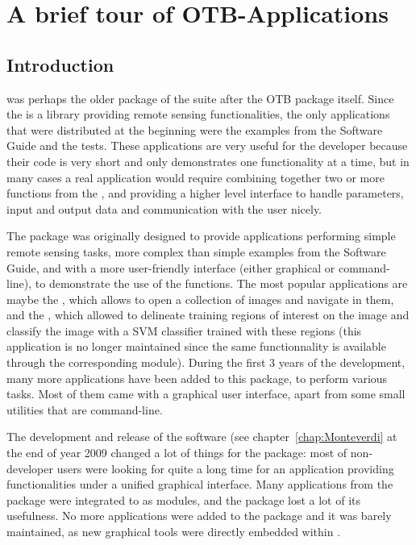 \chapter{A brief tour of OTB-Applications}\label{chap:otb-applications}

\section{Introduction}\label{sec:appintro}

\app was perhaps the older package of the \otb suite after the OTB
package itself. Since the \otb is a library providing remote sensing
functionalities, the only applications that were distributed at the
beginning were the examples from the Software Guide and the
tests. These applications are very useful for the developer because
their code is very short and only demonstrates one functionality at a
time, but in many cases a real application would require combining
together two or more functions from the \otb, and providing a higher
level interface to handle parameters, input and output data and
communication with the user nicely.

The \app package was originally designed to provide applications
performing simple remote sensing tasks, more complex than simple
examples from the Software Guide, and with a more user-friendly
interface (either graphical or command-line), to demonstrate the use
of the \otb functions. The most popular applications are maybe the
, which allows to open a collection
of images and navigate in them, and the
, which allowed to
delineate training regions of interest on the image and classify the
image with a SVM classifier trained with these regions (this
application is no longer maintained since the same functionnality is
available through the corresponding \mont module). During the first 3
years of the \otb development, many more applications have been added
to this package, to perform various tasks. Most of them came with a
graphical user interface, apart from some small utilities that are
command-line.

The development and release of the \mont software (see
chapter~\ref{chap:Monteverdi} at the end of year 2009 changed a lot of
things for the \app package: most of non-developer users were looking
for quite a long time for an application providing \otb
functionalities under a unified graphical interface. Many applications
from the \app package were integrated to \mont as modules, and the
\app package lost a lot of its usefulness. No more applications were
added to the package and it was barely maintained, as new graphical
tools were directly embedded within \mont.

